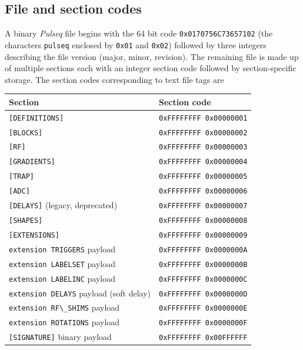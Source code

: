 \documentclass{article}
\begin{document}
\subsection{File and section codes}

A binary \textit{Pulseq} file begins with the 64 bit code \verb.0x0170756C73657102. (the characters \verb.pulseq. enclosed by \verb.0x01. and \verb.0x02.)  followed by three integers describing the file version (major, minor, revision). The remaining file is made up of multiple sections each with an integer section code followed by section-specific storage. The section codes corresponding to text file tags are

\begin{center}
\begin{tabular}{ll}
\toprule
Section & Section code \\
\midrule
\verb.[DEFINITIONS]. & \verb.0xFFFFFFFF 0x00000001. \\
\verb.[BLOCKS]. & \verb.0xFFFFFFFF 0x00000002. \\
\verb.[RF]. & \verb.0xFFFFFFFF 0x00000003. \\
\verb.[GRADIENTS]. & \verb.0xFFFFFFFF 0x00000004. \\
\verb.[TRAP]. & \verb.0xFFFFFFFF 0x00000005. \\
\verb.[ADC]. & \verb.0xFFFFFFFF 0x00000006. \\
\verb.[DELAYS]. (legacy, deprecated) & \verb.0xFFFFFFFF 0x00000007. \\
\verb.[SHAPES]. & \verb.0xFFFFFFFF 0x00000008. \\
\verb.[EXTENSIONS]. & \verb.0xFFFFFFFF 0x00000009. \\
\verb.extension TRIGGERS. payload & \verb.0xFFFFFFFF 0x0000000A. \\
\verb.extension LABELSET. payload & \verb.0xFFFFFFFF 0x0000000B. \\
\verb.extension LABELINC. payload & \verb.0xFFFFFFFF 0x0000000C. \\
\verb.extension DELAYS. payload (soft delay) & \verb.0xFFFFFFFF 0x0000000D. \\
\verb.extension RF\_SHIMS. payload & \verb.0xFFFFFFFF 0x0000000E. \\
\verb.extension ROTATIONS. payload & \verb.0xFFFFFFFF 0x0000000F. \\
\verb.[SIGNATURE]. binary payload & \verb.0xFFFFFFFF 0x00FFFFFF. \\
\bottomrule
\end{tabular}
\end{center}
\end{document}
